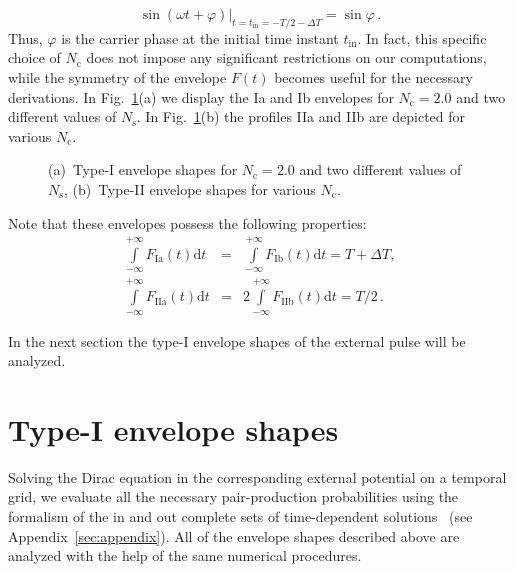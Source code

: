 \documentclass[preprint,aps,prd,showpacs,floatfix]{revtex4-1}
\begin{document}
%
\begin{equation}
\sin(\omega t + \varphi) \Big |_{t=t_\text{in}=-T/2-\Delta T} = \sin \varphi\,.
\label{eq:cep_in}
\end{equation}
%
Thus, $\varphi$ is the carrier phase at the initial time instant $t_\text{in}$. In fact, this specific choice of $N_\text{c}$ does not impose any significant restrictions on our computations, while the symmetry of the envelope $F(t)$ becomes useful for the necessary derivations. In Fig.~\ref{fig:shapes}(a) we display the Ia and Ib envelopes for $N_\text{c} = 2.0$ and two different values of $N_\text{s}$. In Fig.~\ref{fig:shapes}(b) the profiles IIa and IIb are depicted for various $N_\text{c}$.
%
\begin{figure}[h]
\caption{(a)~Type-I envelope shapes for $N_\text{c} = 2.0$ and two different values of $N_\text{s}$, (b)~Type-II envelope shapes for various $N_\text{c}$.}
\label{fig:shapes}
\end{figure}
%
Note that these envelopes possess the following properties:
%
\begin{eqnarray}
\int \limits_{-\infty}^{+\infty} F_\text{Ia} (t) \mathrm{d}t &=&\int \limits_{-\infty}^{+\infty} F_\text{Ib} (t) \mathrm{d}t = T + \Delta T, \label{eq:F_int_I}\\
\int \limits_{-\infty}^{+\infty} F_\text{IIa} (t) \mathrm{d}t &=& 2 \int \limits_{-\infty}^{+\infty} F_\text{IIb} (t) \mathrm{d}t = T/2\,. \label{eq:F_int_II}
\end{eqnarray}
%

\indent In the next section the type-I envelope shapes of the external pulse will be analyzed.
\section{Type-I envelope shapes}\label{sec:type-I}
Solving the Dirac equation in the corresponding external potential on a temporal grid, we evaluate all the necessary pair-production probabilities using the formalism of the in and out complete sets of time-dependent solutions~\cite{fradkin_gitman_shvartsman} (see Appendix~\ref{sec:appendix}). All of the envelope shapes described above are analyzed with the help of the same numerical procedures.
\end{document}
